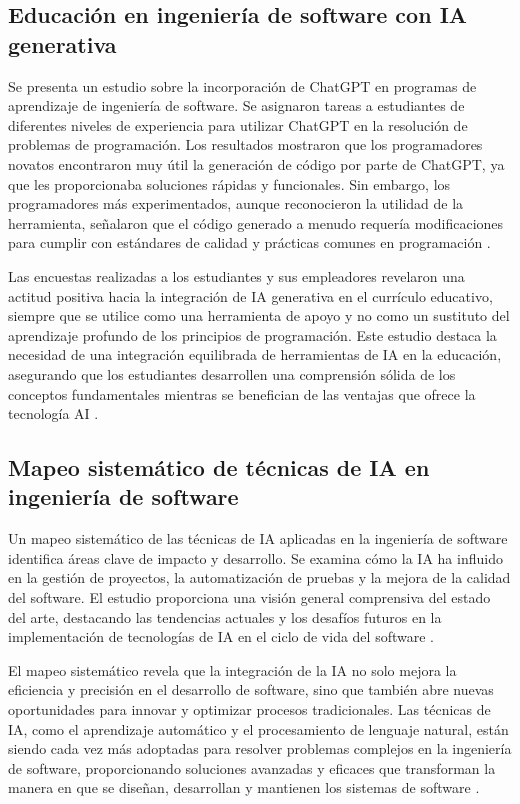 \subsection{Educación en ingeniería de software con IA generativa}

Se presenta un estudio sobre la incorporación de ChatGPT en programas de aprendizaje de ingeniería de software. Se asignaron tareas a estudiantes de diferentes niveles de experiencia para utilizar ChatGPT en la resolución de problemas de programación. Los resultados mostraron que los programadores novatos encontraron muy útil la generación de código por parte de ChatGPT, ya que les proporcionaba soluciones rápidas y funcionales. Sin embargo, los programadores más experimentados, aunque reconocieron la utilidad de la herramienta, señalaron que el código generado a menudo requería modificaciones para cumplir con estándares de calidad y prácticas comunes en programación \cite{Petrovska2023}.

Las encuestas realizadas a los estudiantes y sus empleadores revelaron una actitud positiva hacia la integración de IA generativa en el currículo educativo, siempre que se utilice como una herramienta de apoyo y no como un sustituto del aprendizaje profundo de los principios de programación. Este estudio destaca la necesidad de una integración equilibrada de herramientas de IA en la educación, asegurando que los estudiantes desarrollen una comprensión sólida de los conceptos fundamentales mientras se benefician de las ventajas que ofrece la tecnología AI \cite{Petrovska2023}.

\subsection{Mapeo sistemático de técnicas de IA en ingeniería de software}

Un mapeo sistemático de las técnicas de IA aplicadas en la ingeniería de software identifica áreas clave de impacto y desarrollo. Se examina cómo la IA ha influido en la gestión de proyectos, la automatización de pruebas y la mejora de la calidad del software. El estudio proporciona una visión general comprensiva del estado del arte, destacando las tendencias actuales y los desafíos futuros en la implementación de tecnologías de IA en el ciclo de vida del software \cite{Sofian2022}.

El mapeo sistemático revela que la integración de la IA no solo mejora la eficiencia y precisión en el desarrollo de software, sino que también abre nuevas oportunidades para innovar y optimizar procesos tradicionales. Las técnicas de IA, como el aprendizaje automático y el procesamiento de lenguaje natural, están siendo cada vez más adoptadas para resolver problemas complejos en la ingeniería de software, proporcionando soluciones avanzadas y eficaces que transforman la manera en que se diseñan, desarrollan y mantienen los sistemas de software \cite{Sofian2022}.

